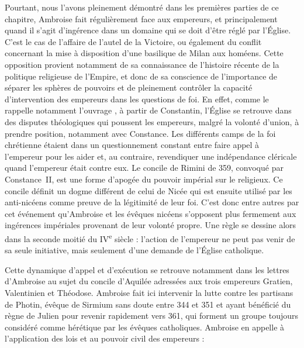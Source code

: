 \bigskip

Pourtant, nous l'avons pleinement démontré dans les premières parties de ce chapitre, Ambroise fait régulièrement face aux empereurs, et principalement quand il s'agit d'ingérence dans un domaine qui se doit d'être réglé par l'Église. C'est le cas de l'affaire de l'autel de la Victoire, ou également du conflit concernant la mise à disposition d'une basilique de Milan aux homéens. Cette opposition provient notamment de sa connaissance de l'histoire récente de la politique religieuse de l'Empire, et donc de sa conscience de l'importance de séparer les sphères de pouvoirs et de pleinement contrôler la capacité d'intervention des empereurs dans les questions de foi. En effet, comme le rappelle notamment l'ouvrage , à partir de Constantin, l'Église se retrouve dans des disputes théologiques qui poussent les empereurs, malgré la volonté d’union, à prendre position, notamment avec Constance. Les différents camps de la foi chrétienne étaient dans un questionnement constant entre faire appel à l’empereur pour les aider et, au contraire, revendiquer une indépendance cléricale quand l’empereur était contre eux\autocite[658]{rowe_history}. Le concile de Rimini de 359, convoqué par Constance~II, est une forme d'apogée du pouvoir impérial sur le religieux. Ce concile définit un dogme différent de celui de Nicée qui est ensuite utilisé par les anti-nicéens comme preuve de la légitimité de leur foi. C'est donc entre autres par cet événement qu'Ambroise et les évêques nicéens s'opposent plus fermement aux ingérences impériales provenant de leur volonté propre. Une règle se dessine alors dans la seconde moitié du IV\textsuperscript{e} siècle : l'action de l'empereur ne peut pas venir de sa seule initiative, mais seulement d'une demande de l'Église catholique.

\bigskip

Cette dynamique d'appel et d'exécution se retrouve notamment dans les lettres d'Ambroise au sujet du concile d'Aquilée\autocite[ec 4, 5 et 6]{ambroise_csel_82_3} adressées aux trois empereurs Gratien, Valentinien et Théodose. Ambroise fait ici intervenir la lutte contre les partisans de Photin, évêque de Sirmium sans doute entre 344 et 351 et ayant bénéficié du règne de Julien pour revenir rapidement vers 361, qui forment un groupe toujours considéré comme hérétique par les évêques catholiques. Ambroise en appelle à l'application des lois et au pouvoir civil des empereurs :

